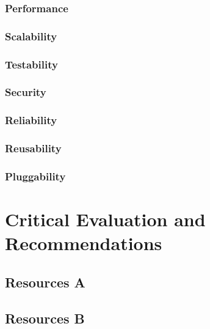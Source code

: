 \documentclass[a4paper]{article}
\begin{document}
\subsubsection {Performance}
\subsubsection {Scalability}
\subsubsection {Testability}
\subsubsection {Security}
\subsubsection {Reliability}
\subsubsection {Reusability}
\subsubsection {Pluggability}


\section {Critical Evaluation and Recommendations}
\subsection {Resources A}
\subsection {Resources B}
\end{document}
